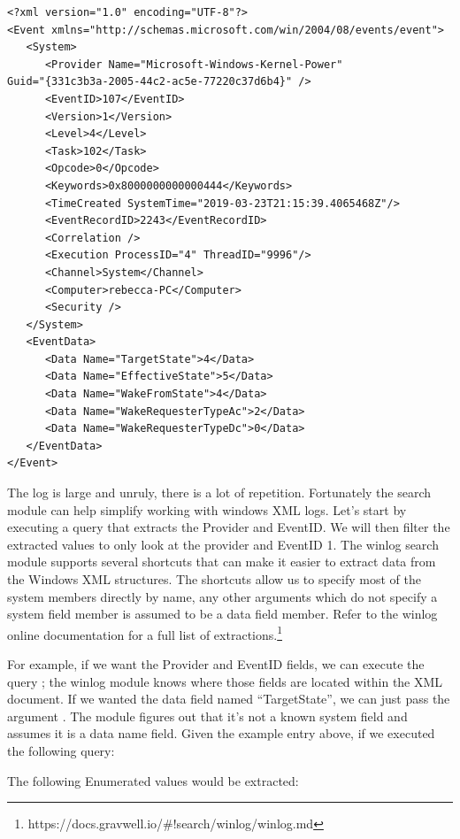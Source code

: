 \begin{Verbatim}[breaklines=true]
<?xml version="1.0" encoding="UTF-8"?>
<Event xmlns="http://schemas.microsoft.com/win/2004/08/events/event">
   <System>
      <Provider Name="Microsoft-Windows-Kernel-Power"
Guid="{331c3b3a-2005-44c2-ac5e-77220c37d6b4}" />
      <EventID>107</EventID>
      <Version>1</Version>
      <Level>4</Level>
      <Task>102</Task>
      <Opcode>0</Opcode>
      <Keywords>0x8000000000000444</Keywords>
      <TimeCreated SystemTime="2019-03-23T21:15:39.4065468Z"/>
      <EventRecordID>2243</EventRecordID>
      <Correlation />
      <Execution ProcessID="4" ThreadID="9996"/>
      <Channel>System</Channel>
      <Computer>rebecca-PC</Computer>
      <Security />
   </System>
   <EventData>
      <Data Name="TargetState">4</Data>
      <Data Name="EffectiveState">5</Data>
      <Data Name="WakeFromState">4</Data>
      <Data Name="WakeRequesterTypeAc">2</Data>
      <Data Name="WakeRequesterTypeDc">0</Data>
   </EventData>
</Event>
\end{Verbatim}

The log is large and unruly, there is a lot of repetition. Fortunately
the  search module can help simplify working with windows XML
logs. Let's start by executing a query that extracts the Provider and
EventID. We will then filter the extracted values to only look at the
 provider and EventID 1. The winlog
search module supports several shortcuts that can make it easier to
extract data from the Windows XML structures. The shortcuts allow us to
specify most of the system members directly by name, any other arguments
which do not specify a system field member is assumed to be a data field
member. Refer to the winlog online documentation for a full list of extractions.\footnote{https://docs.gravwell.io/\#!search/winlog/winlog.md}

For example, if we want the Provider and EventID fields, we can
execute the query ; the winlog module knows
where those fields are located within the XML document. If we wanted the data field named
``TargetState'', we can just pass the argument . The
 module figures out that it's not a known system field and
assumes it is a data name field. Given the example entry above, if we
executed the following query:



The following Enumerated values would be extracted:

